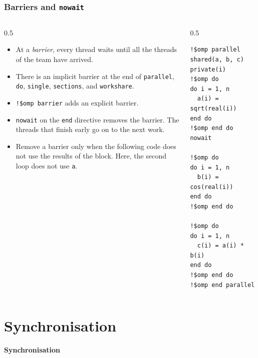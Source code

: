\begin{frame}[fragile]
  \frametitle{Barriers and \texttt{nowait}}
  \begin{columns}[T]
    \begin{column}{0.5\textwidth}
      \begin{itemize}
        \item At a \emph{barrier}, every thread waits until all the threads of the team have arrived.
        \item There is an implicit barrier at the end of \texttt{parallel}, \texttt{do}, \texttt{single}, \texttt{sections}, and \texttt{workshare}.
        \item \texttt{!\$omp barrier} adds an explicit barrier.
        \item \texttt{nowait} on the \texttt{end} directive removes the barrier. The threads that finish early go on to the next work.
        \item Remove a barrier only when the following code does not use the results of the block. Here, the second loop does not use \texttt{a}.
      \end{itemize}
    \end{column}

    \begin{column}{0.5\textwidth}
      \begin{lstlisting}
!$omp parallel shared(a, b, c) private(i)
!$omp do
do i = 1, n
  a(i) = sqrt(real(i))
end do
!$omp end do nowait

!$omp do
do i = 1, n
  b(i) = cos(real(i))
end do
!$omp end do

!$omp do
do i = 1, n
  c(i) = a(i) * b(i)
end do
!$omp end do
!$omp end parallel
      \end{lstlisting}
    \end{column}
  \end{columns}
\end{frame}


\section{Synchronisation}

\begin{frame}
  \centering
  \Huge \textbf{Synchronisation}
\end{frame}


